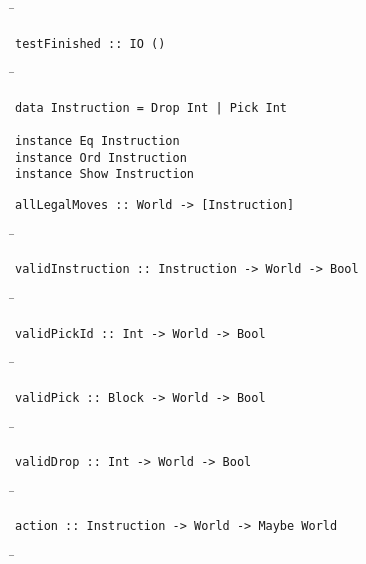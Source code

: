 \begin{tabbing}
\hspace*{1cm}\= \kill
\> 
\end{tabbing}
\begin{verbatim}
testFinished :: IO ()
\end{verbatim}
\begin{tabbing}
\hspace*{1cm}\= \kill
\> 
\end{tabbing}
\begin{verbatim}
data Instruction = Drop Int | Pick Int

instance Eq Instruction
instance Ord Instruction
instance Show Instruction
\end{verbatim}
\begin{verbatim}
allLegalMoves :: World -> [Instruction]
\end{verbatim}
\begin{tabbing}
\hspace*{1cm}\= \kill
\> 
\end{tabbing}
\begin{verbatim}
validInstruction :: Instruction -> World -> Bool
\end{verbatim}
\begin{tabbing}
\hspace*{1cm}\= \kill
\> 
\end{tabbing}
\begin{verbatim}
validPickId :: Int -> World -> Bool
\end{verbatim}
\begin{tabbing}
\hspace*{1cm}\= \kill
\> 
\end{tabbing}
\begin{verbatim}
validPick :: Block -> World -> Bool
\end{verbatim}
\begin{tabbing}
\hspace*{1cm}\= \kill
\> 
\end{tabbing}
\begin{verbatim}
validDrop :: Int -> World -> Bool
\end{verbatim}
\begin{tabbing}
\hspace*{1cm}\= \kill
\> 
\end{tabbing}
\begin{verbatim}
action :: Instruction -> World -> Maybe World
\end{verbatim}
\begin{tabbing}
\hspace*{1cm}\= \kill
\> 
\end{tabbing}
